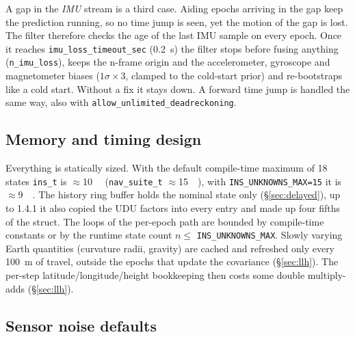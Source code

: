 \documentclass[11pt,a4paper]{article}
\newcommand{\code}[1]{\texttt{#1}}
\begin{document}
A gap in the \emph{IMU} stream is a third case. Aiding epochs arriving in the
gap keep the prediction running, so no time jump is seen, yet the motion of
the gap is lost. The filter therefore checks the age of the last IMU sample on
every epoch. Once it reaches
\code{imu\_\allowbreak{}loss\_\allowbreak{}timeout\_\allowbreak{}sec}
(\SI{0.2}{\second}) the filter stops before fusing anything
(\code{n\_\allowbreak{}imu\_\allowbreak{}loss}), keeps the n-frame origin and
the accelerometer, gyroscope and magnetometer biases ($1\sigma \times 3$,
clamped to the cold-start prior) and re-bootstraps like a cold start. Without
a fix it stays down. A forward time jump is handled the same way, also with
\code{allow\_\allowbreak{}unlimited\_\allowbreak{}deadreckoning}.

\subsection{Memory and timing design}

Everything is statically sized. With the default compile-time maximum of
18 states \code{ins\_\allowbreak{}t} is $\approx$\SI{10}{\kibi\byte}
(\code{nav\_\allowbreak{}suite\_\allowbreak{}t}
$\approx$\SI{15}{\kibi\byte}), with
\code{INS\_\allowbreak{}UNKNOWNS\_\allowbreak{}MAX=15} it is
$\approx$\SI{9}{\kibi\byte}. The history ring buffer holds the nominal
state only (\S\ref{sec:delayed}), up to 1.4.1 it also copied the UDU
factors into every entry and made up four fifths of the struct.
The loops of the per-epoch path are bounded by compile-time constants or by the
runtime state count $n \le$ \code{INS\_\allowbreak{}UNKNOWNS\_\allowbreak{}MAX}.
Slowly varying Earth quantities (curvature radii, gravity) are cached
and refreshed only every \SI{100}{\metre} of travel, outside the epochs
that update the covariance (\S\ref{sec:llh}). The per-step
latitude/longitude/height bookkeeping then costs some double
multiply-adds (\S\ref{sec:llh}).

\subsection{Sensor noise defaults}
\label{sec:defaults}
\end{document}
